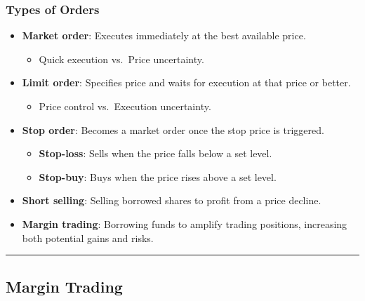 \documentclass[
  letterpaper,
  DIV=11,
  numbers=noendperiod]{scrartcl}
\providecommand{\tightlist}{%
  \setlength{\itemsep}{0pt}\setlength{\parskip}{0pt}}\usepackage{longtable,booktabs,array}
\begin{document}
\subsubsection{Types of Orders}\label{types-of-orders}

\begin{itemize}
\tightlist
\item
  \textbf{Market order}: Executes immediately at the best available
  price.

  \begin{itemize}
  \tightlist
  \item
    Quick execution vs.~Price uncertainty.
  \end{itemize}
\item
  \textbf{Limit order}: Specifies price and waits for execution at that
  price or better.

  \begin{itemize}
  \tightlist
  \item
    Price control vs.~Execution uncertainty.
  \end{itemize}
\item
  \textbf{Stop order}: Becomes a market order once the stop price is
  triggered.

  \begin{itemize}
  \tightlist
  \item
    \textbf{Stop-loss}: Sells when the price falls below a set level.
  \item
    \textbf{Stop-buy}: Buys when the price rises above a set level.
  \end{itemize}
\item
  \textbf{Short selling}: Selling borrowed shares to profit from a price
  decline.
\item
  \textbf{Margin trading}: Borrowing funds to amplify trading positions,
  increasing both potential gains and risks.
\end{itemize}

\begin{center}\rule{0.5\linewidth}{0.5pt}\end{center}

\subsection{Margin Trading}\label{margin-trading}
\end{document}
